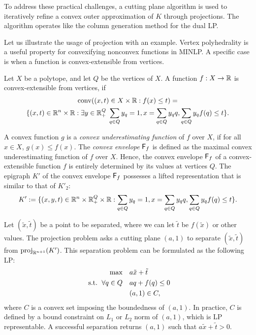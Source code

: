 To address these practical challenges, a cutting plane algorithm is used to iteratively refine a convex outer approximation of $K$ through projections. The algorithm operates like the column generation method for the dual LP.

Let us illustrate the usage of projection with an example. Vertex polyhedrality is a useful property for convexifying nonconvex functions in MINLP. A specific case is when a function is convex-extensible from vertices.
\begin{definition}
  Let $X$ be a polytope, and let $Q$ be the vertices of $X$. A function $f:X \to \mathbb R$ is convex-extensible from vertices,  if
  \begin{multline}
    \operatorname{conv}({(x,t) \in X \times \mathbb R: f(x) \le t}) =\\  \{(x,t) \in \mathbb R^n \times \mathbb R: \exists y \in  \mathbb R^{Q}_+ \; \sum_{q \in Q} y_q = 1,  x = \sum_{q \in Q}  y_q q,  \sum_{q \in Q}  y_q f(q) \le t\}.
  \end{multline}
\end{definition}

A convex function $g $ is a \textit{convex underestimating function} of $f$ over $X$, if for all $x \in X$, $g(x) \le f(x)$.
The \textit{convex envelope} ${\mathsf F}_f$ is defined as the maximal convex underestimating function of $f$ over $X$.
Hence, the convex envelope ${\mathsf F}_{f}$ of a convex-extensible function $f$ is entirely determined by its values at vertices $Q$. The epigraph $K'$ of the convex envelope ${\mathsf F}_{f}$ possesses a lifted representation that is similar to that of $K'_2$:
\begin{equation}
    K':= \{(x,y,t) \in \mathbb R^n \times \mathbb R^{Q}_+ \times \mathbb R: \sum_{q \in Q} y_q = 1, x = \sum_{q \in Q}  y_q q,  \sum_{q \in Q}  y_q f(q) \le t\}.
\end{equation}

Let $(\tilde{x}, \tilde{t})$ be a point to be separated, where we can let $\tilde{t}$ be $f(\tilde{x})$ or other values.
The projection problem asks  a cutting plane $(a,1)$ to separate $(\tilde{x}, \tilde{t})$ from $\operatorname{proj}_{\mathbb R^{n+1}}(K')$.  This separation problem can be formulated as the following LP:
 \begin{subequations}
    \label{seplp}
    \begin{align}
       \max &  \quad  a \tilde{x} +  \tilde{t}  \\
    \textup{ s.t. } \,   \forall q \in Q & \quad aq +  f(q) \le 0\\
       &  \quad  (a,1) \in C,
    \end{align}
\end{subequations}
where $C$ is a convex set imposing the  boundedness of $(a,1)$.  In practice, $C$ is defined by a bound constraint on $L_1$ or $L_2$ norm of $(a,1)$, which is LP representable. A successful separation returns $(a,1)$ such that $a \tilde{x} +  \tilde{t} > 0$.

